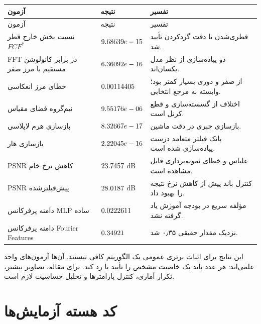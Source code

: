 \documentclass[12pt,openany,oneside]{book}
\begin{document}
\begin{longtable}{p{}p{}p{}}
\toprule
آزمون & نتیجه & تفسیر\\
\midrule
\endfirsthead
\toprule
آزمون & نتیجه & تفسیر\\
\midrule
\endhead
نسبت بخش خارج قطر \(FCF^*\) & \(9.68639e-15\) & قطری‌شدن تا دقت گردکردن تأیید شد.\\
FFT در برابر کانولوشن مستقیم با مرز صفر & \(6.36092e-16\) & دو پیاده‌سازی از نظر مدل یکسان‌اند.\\
خطای مرز انعکاسی & \(0.00114405\) & از صفر و دوری بسیار کمتر بود؛ وابسته به مرجع انتخابی.\\
نیم‌گروه فضای مقیاس & \(9.55176e-06\) & اختلاف از گسسته‌سازی و قطع کرنل است.\\
بازسازی هرم لاپلاسی & \(8.32667e-17\) & بازسازی جبری در دقت ماشین.\\
بازسازی هار & \(2.22045e-16\) & بانک فیلتر متعامد درست پیاده‌سازی شده است.\\
PSNR کاهش نرخ خام & \(23.7457\) dB & علیاس و خطای نمونه‌برداری قابل مشاهده است.\\
PSNR پیش‌فیلترشده & \(28.0187\) dB & کنترل باند پیش از کاهش نرخ نتیجه را بهبود داد.\\
دامنه پرفرکانس MLP ساده & \(0.0222611\) & مؤلفه سریع در بودجه آموزش یاد گرفته نشد.\\
دامنه پرفرکانس Fourier Features & \(0.34921\) & نزدیک مقدار حقیقی ۰٫۳۵ شد.\\
\bottomrule
\end{longtable}

\begin{warningbox}
این نتایج برای اثبات برتری عمومی یک الگوریتم کافی نیستند. آن‌ها آزمون‌های واحد علمی‌اند: هر عدد باید یک
خاصیت مشخص را تأیید یا رد کند. برای مقاله، تصاویر بیشتر، تکرار آماری، کنترل پارامترها و تحلیل حساسیت لازم است.
\end{warningbox}

\section{کد هسته آزمایش‌ها}
\end{document}
